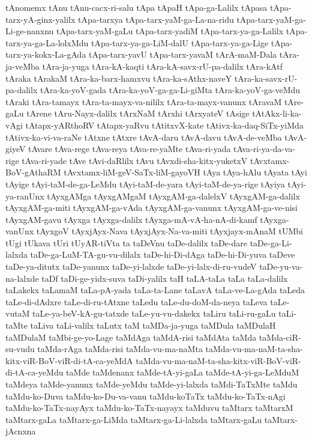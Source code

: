 {tAnomemx
tAnu
tAnu-cacx-ri-salu
tApa
tApaH
tApa-ga-Lalilx
tApasa
tApa-tarx-yA-ginx-yalilx
tApa-tarxya
tApa-tarx-yaM-ga-La-na-ridu
tApa-tarx-yaM-ga-Li-ge-nanxnu
tApa-tarx-yaM-gaLu
tApa-tarx-yadiM
tApa-tarx-ya-ga-Lalilx
tApa-tarx-ya-ga-La-lolxMdu
tApa-tarx-ya-ga-LiM-dalU
tApa-tarx-ya-ga-Lige
tApa-tarx-ya-kokx-La-gAda
tApa-tarx-yavU
tApa-tarx-yavaM
tArA-maM-Dala
tAra-ja-veMba
tAra-ja-yuga
tAra-kA-kaqti
tAra-kA-savx-rU-pa-dalilx
tAra-kAtf
tAraka
tArakaM
tAra-ka-barx-hamxvu
tAra-ka-sAthx-naveY
tAra-ka-savx-rU-pa-dalilx
tAra-ka-yoV-gada
tAra-ka-yoV-ga-ga-Li-giMta
tAra-ka-yoV-ga-veMdu
tAraki
tAra-tamayx
tAra-ta-mayx-va-nililx
tAra-ta-mayx-vanunx
tAravaM
tAre-gaLu
tArene
tAru-Nayx-dalilx
tArxNaM
tArxhi
tArxyateV
tAsige
tAtAkx-li-ka-vAgi
tAtapx-yARthoRV
tAtapx-yaRvu
tAtitxvX-kate
tAtivx-ka-daq-SiTx-yiMda
tAtivx-ka-vi-va-raNe
tAtxne
tAtxre
tAvA-daru
tAvA-davu
tAvA-de-veMba
tAvA-giyeV
tAvare
tAva-rege
tAva-reya
tAva-re-yaMte
tAva-ri-yada
tAva-ri-ya-da-va-rige
tAva-ri-yade
tAve
tAvi-daRlilx
tAvu
tAvxdi-sha-kitx-yuketxV
tAvxtamx-BoV-gAthaRM
tAvxtamx-liM-geV-SaTx-liM-gayoVH
tAya
tAya-hAlu
tAyata
tAyi
tAyige
tAyi-taM-de-ga-LeMdu
tAyi-taM-de-yara
tAyi-taM-de-ya-rige
tAyiya
tAyi-ya-ranUnx
tAyxgAMga
tAyxgAMgaM
tAyxgAM-ga-dalelxV
tAyxgAM-ga-dalilx
tAyxgAM-ga-miti
tAyxgAM-ga-vAda
tAyxgAM-ga-vanunx
tAyxgAM-ga-ve-nisi
tAyxgAM-gavu
tAyxga
tAyxga-dalilx
tAyxga-mA-vA-ha-nA-di-kamf
tAyxga-vanUnx
tAyxgoV
tAyxjAyx-Nava
tAyxjAyx-Na-va-miti
tAyxjayx-mAnaM
tUMbi
tUgi
tUkava
tUri
tUyAR-tiVta
ta
taDeVnu
taDe-dalilx
taDe-dare
taDe-ga-Li-lalxda
taDe-ga-LuM-TA-gu-vu-dilalx
taDe-hi-Di-dAga
taDe-hi-Di-yuva
taDeve
taDe-ya-ditutx
taDe-yanunx
taDe-yi-lalxde
taDe-yi-lalx-di-ru-vudeV
taDe-yu-va-na-lalxde
taDf
taDi-ge-yidx-suva
taDi-yalilx
taH
taLA-taLa
taLa
taLa-dalilx
taLakekx
taLamaM
taLa-pA-yada
taLa-ta-Lane
taLavA
taLa-ve-La-gAda
taLeda
taLe-di-dAdxre
taLe-di-ru-tAtxne
taLedu
taLe-du-doM-da-neya
taLeva
taLe-vutaM
taLe-ya-beV-kA-gu-tatxde
taLe-yu-vu-dakekx
taLiru
taLi-ru-gaLu
taLi-taMte
taLiva
taLi-valilx
taLutx
taM
taMDa-ja-yuga
taMDula
taMDulaH
taMDulaM
taMbi-ge-yo-Lage
taMdAga
taMdA-risi
taMdAta
taMda
taMda-ciR-su-vudu
taMda-rAga
taMda-risi
taMda-vu-ma-naMta
taMda-vu-ma-naM-ta-sha-kitx-viR-BoV-viR-di-tA-ca-yeMdA
taMda-vu-ma-naM-ta-sha-kitx-viR-BoV-viR-di-tA-ca-yeMdu
taMde
taMdenanx
taMde-tA-yi-gaLa
taMde-tA-yi-ga-LeMduM
taMdeya
taMde-yanunx
taMde-yeMdu
taMde-yi-lalxda
taMdi-TaTxMte
taMdu
taMdu-ko-Duva
taMdu-ko-Du-va-vanu
taMdu-koTaTx
taMdu-ko-TaTx-nAgi
taMdu-ko-TaTx-nayAyx
taMdu-ko-TaTx-nayayx
taMduvu
taMtarx
taMtarxM
taMtarx-gaLa
taMtarx-ga-LiMda
taMtarx-ga-Li-lalxda
taMtarx-gaLu
taMtarx-jAcnxna
}
